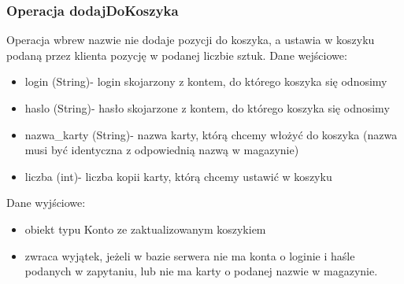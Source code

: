 \documentclass[11pt]{article}   %
\begin{document}
\subsubsection{Operacja dodajDoKoszyka}
Operacja wbrew nazwie nie dodaje pozycji do koszyka, a ustawia w koszyku podaną przez klienta pozycję w podanej liczbie sztuk.\newline
Dane wejściowe:
\begin{itemize}
\item login (String)- login skojarzony z kontem, do którego koszyka się odnosimy
\item haslo (String)- hasło skojarzone z kontem, do którego koszyka się odnosimy
\item nazwa\_karty (String)- nazwa karty, którą chcemy włożyć do koszyka (nazwa musi być identyczna z odpowiednią nazwą w magazynie)
\item liczba (int)- liczba kopii karty, którą chcemy ustawić w koszyku
\end{itemize}	
Dane wyjściowe:
\begin{itemize}
	\item obiekt typu Konto ze zaktualizowanym koszykiem
	\item zwraca wyjątek, jeżeli w bazie serwera nie ma konta o loginie i haśle podanych w zapytaniu, lub nie ma karty o podanej nazwie w magazynie.
\end{itemize}



\end{document}
